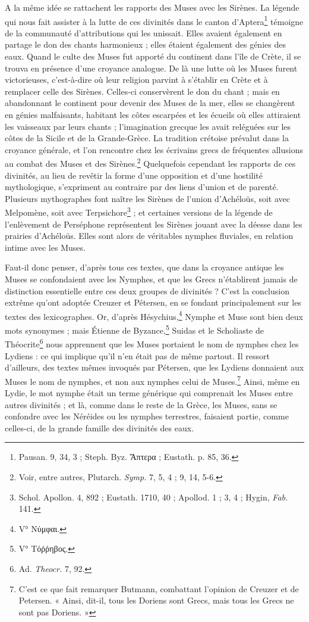 \documentclass[landscape, a4paper, 11pt, oneside, polutonikogreek, french]{article}
\begin{document}
A la même idée se rattachent les rapports des Muses avec les Sirènes. La légende qui nous fait assister à la lutte de ces divinités dans le canton d'Aptera\footnote{Pausan. 9, 34, 3 ; Steph. Byz. Ἄπτερα ; Eustath. p. 85, 36.} témoigne de la communauté d'attributions qui les unissait. Elles avaient également en partage le don des chants harmonieux ; elles étaient également des génies des eaux. Quand le culte des Muses fut apporté du continent dans l'île de Crète, il se trouva en présence d'une croyance analogue. De là une lutte où les Muses furent victorieuses, c'est-à-dire où leur religion parvint à s'établir en Crète et à remplacer celle des Sirènes. Celles-ci conservèrent le don du chant ; mais en abandonnant le continent pour devenir des Muses de la mer, elles se changèrent en génies malfaisants, habitant les côtes escarpées et les écueils où elles attiraient les vaisseaux par leurs chants ; l'imagination grecque les avait reléguées sur les côtes de la Sicile et de la Grande-Grèce. La tradition crétoise prévalut dans la croyance générale, et l'on rencontre chez les écrivains grecs de fréquentes allusions au combat des Muses et des Sirènes.\footnote{Voir, entre autres, Plutarch. \emph{Symp.} 7, 5, 4 ; 9, 14, 5-6.} Quelquefois cependant les rapports de ces divinités, au lieu de revêtir la forme d'une opposition et d'une hostilité mythologique, s'expriment au contraire par des liens d'union et de parenté. Plusieurs mythographes font naître les Sirènes de l'union d'Achéloüs, soit avec Melpomène, soit avec Terpsichore\footnote{Schol. Apollon. 4, 892 ; Eustath. 1710, 40 ; Apollod. 1 ; 3, 4 ; Hygin, \emph{Fab.} 141.} ; et certaines versions de la légende de l'enlèvement de Perséphone représentent les Sirènes jouant avec la déesse dans les prairies d'Achéloüs. Elles sont alors de véritables nymphes fluviales, en relation intime avec les Muses.

Faut-il donc penser, d'après tous ces textes, que dans la croyance antique les Muses se confondaient avec les Nymphes, et que les Grecs n'établirent jamais de distinction essentielle entre ces deux groupes de divinités ? C'est la conclusion extrême qu'ont adoptée Creuzer et Pétersen, en se fondant principalement sur les textes des lexicographes. Or, d'après Hésychius,\footnote{V° Νύμφαι.} Nymphe et Muse sont bien deux mots synonymes ; mais Étienne de Byzance,\footnote{V° Τόῤῥηβος.} Suidas et le Scholiaste de Théocrite\footnote{Ad. \emph{Theocr.} 7, 92.} nous apprennent que les Muses portaient le nom de nymphes chez les Lydiens : ce qui implique qu'il n'en était pas de même partout. Il ressort d'ailleurs, des textes mêmes invoqués par Pétersen, que les Lydiens donnaient aux Muses le nom de nymphes, et non aux nymphes celui de Muses.\footnote{C'est ce que fait remarquer Butmann, combattant l'opinion de Creuzer et de Petersen. « Ainsi, dit-il, tous les Doriens sont Grecs, mais tous les Grecs ne sont pas Doriens. »} Ainsi, même en Lydie, le mot nymphe était un terme générique qui comprenait les Muses entre autres divinités ; et là, comme dans le reste de la Grèce, les Muses, sans se confondre avec les Néréides ou les nymphes terrestres, faisaient partie, comme celles-ci, de la grande famille des divinités des eaux.
\end{document}

